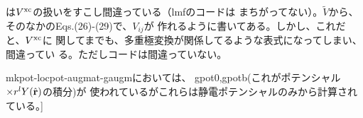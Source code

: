 \documentclass[a4paper,10pt,aip,onecolumn,amsmath,amssymb,floatfix,rmp]{revtex4-1}
\newcommand{\bfr}{{\bf r}}
\newcommand{\req}[1]{\mbox{Eq.~\!(\ref{#1})}}
\def\tn{\tilde{n}}
\def\tV{\tilde{V}}
\begin{document}



\cite{lmfchap}は$V^{\rm xc}$の扱いをすこし間違っている（lmfのコードは
まちがってない）。$\tV$から、そのなかのEqs.(26)-(29)で、$V_{ij}$が
作れるように書いてある。しかし、これだと、$V^{\rm xc}$に
関してまでも、多重極変換が関係してるような表式になってしまい、間違ってい
る。ただしコードは間違っていない。

mkpot-locpot-augmat-gaugmにおいては、
gpot0,gpotb(これがポテンシャル$\times r^l Y(\hat{\bfr})$の積分)が
使われているがこれらは静電ポテンシャルのみから計算されている。]




\end{document}
